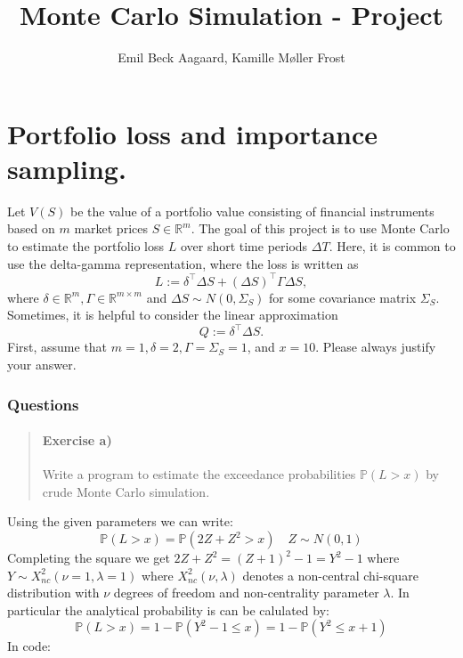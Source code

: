 \documentclass[11pt]{article}
\title{Monte Carlo Simulation - Project}
\author{Emil Beck Aagaard, Kamille Møller Frost}
\begin{document}
    
    \maketitle
    
    

    
    \section{Portfolio loss and importance
sampling.}\label{portfolio-loss-and-importance-sampling.}

    Let \(V(S)\) be the value of a portfolio value consisting of financial
instruments based on \(m\) market prices \(S \in \mathbb{R}^m\). The
goal of this project is to use Monte Carlo to estimate the portfolio
loss \(L\) over short time periods \(\Delta T\). Here, it is common to
use the delta-gamma representation, where the loss is written as \[
L:=\delta^{\top} \Delta S+(\Delta S)^{\top} \Gamma \Delta S,
\] where \(\delta \in \mathbb{R}^m, \Gamma \in \mathbb{R}^{m \times m}\)
and \(\Delta S \sim N\left(0,
\Sigma_S\right)\) for some covariance matrix \(\Sigma_S\). Sometimes, it
is helpful to consider the linear approximation \[
Q:=\delta^{\top} \Delta S .
\] First, assume that \(m=1, \delta=2, \Gamma=\Sigma_S=1\), and
\(x=10\). Please always justify your answer.

    \subsubsection{Questions}\label{questions}

    \begin{quote}
\mbox{}%
\paragraph{Exercise a)}\label{exercise-a}

Write a program to estimate the exceedance probabilities
\(\mathbb{P}(L>x)\) by crude Monte Carlo simulation.
\end{quote}

    Using the given parameters we can write: \[
\mathbb{P}(L > x) = \mathbb{P}(2Z + Z^2 >x) \quad Z \sim N(0,1)
\] Completing the square we get \(2Z + Z^2 =(Z+1)^2-1= Y^2 - 1\) where
\(Y \sim X^2_{nc}(\nu = 1, \lambda = 1)\) where
\(X^2_{nc}(\nu, \lambda)\) denotes a non-central chi-square distribution
with \(\nu\) degrees of freedom and non-centrality parameter
\(\lambda\). In particular the analytical probability is can be
calulated by: \[
\mathbb{P}(L > x) = 1 - \mathbb{P}(Y^2 -1 \le x ) = 1 - \mathbb{P}(Y^2 \le x +1)
\] In code:
\end{document}
